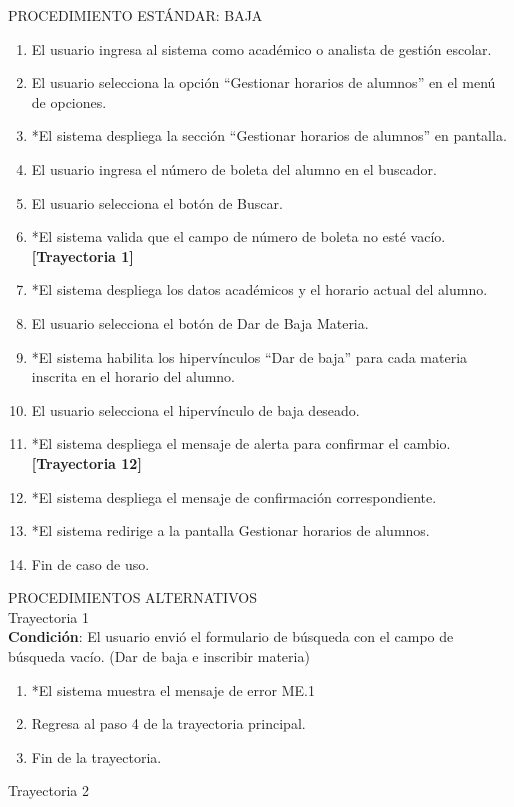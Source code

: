 \vspace*{1cm}
\Large{PROCEDIMIENTO ESTÁNDAR: BAJA}
\large{}
\begin{enumerate}
    \item El usuario ingresa al sistema como académico o analista de gestión escolar.
    \item El usuario selecciona la opción “Gestionar horarios de alumnos” en el menú de opciones.
    \item *El sistema despliega la sección “Gestionar horarios de alumnos” en pantalla.
    \item El usuario ingresa el número de boleta del alumno en el buscador.
    \item El usuario selecciona el botón de Buscar.
    \item *El sistema valida que el campo de número de boleta no esté vacío. \textbf{[Trayectoria 1]}
    \item *El sistema despliega los datos académicos y el horario actual del alumno.
    \item El usuario selecciona el botón de Dar de Baja Materia.
    \item *El sistema habilita los hipervínculos “Dar de baja” para cada materia inscrita en el horario del alumno.
    \item El usuario selecciona el hipervínculo de baja deseado.
    \item *El sistema despliega el mensaje de alerta para confirmar el cambio. \textbf{[Trayectoria 12]}
    \item *El sistema despliega el mensaje de confirmación correspondiente.
    \item *El sistema redirige a la pantalla Gestionar horarios de alumnos.
    \item Fin de caso de uso.
\end{enumerate}
\vspace*{1cm}
\Large{PROCEDIMIENTOS ALTERNATIVOS}\\
\large{Trayectoria 1}\\
\textbf{Condición}: El usuario envió el formulario de búsqueda con el campo de búsqueda vacío. (Dar de baja e inscribir materia)
\begin{enumerate}
    \item *El sistema muestra el mensaje de error ME.1
    \item Regresa al paso 4 de la trayectoria principal.
    \item Fin de la trayectoria.
\end{enumerate}
\large{Trayectoria 2}\\
